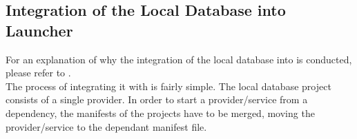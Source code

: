\subsection{Integration of the Local Database into Launcher}
\label{sec:developments:localdbtolauncher}
For an explanation of why the integration of the local database into \launcher is conducted, please refer to .\\

The process of integrating it with \launcher is fairly simple. 
The local database project consists of a single provider.
In order to start a provider/service from a dependency, the manifests of the projects have to be merged, moving the provider/service to the dependant manifest file.
